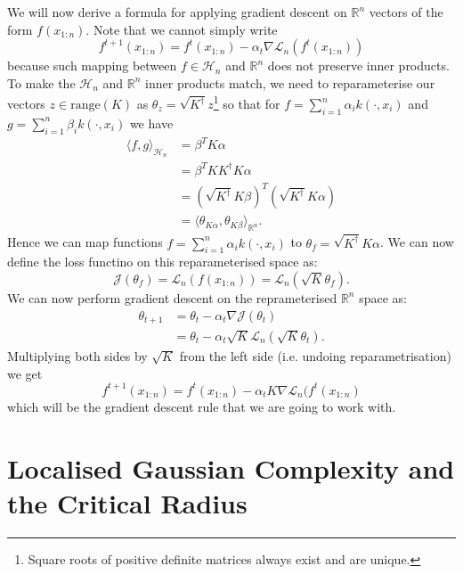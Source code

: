 We will now derive a formula for applying gradient descent on $\mathbb{R}^{n}$ vectors
of the form $f(x_{1:n})$.
Note that we cannot simply write
$$
f^{t+1}(x_{1:n}) = f^{t}(x_{1:n}) - \alpha_{t} \nabla \mathcal{L}_{n}(f^{t}(x_{1:n}))
$$
because such mapping between $f \in \mathcal{H}_{n}$ and $\mathbb{R}^{n}$ does not
preserve inner products.
To make the $\mathcal{H}_{n}$ and $\mathbb{R}^{n}$ inner products match,
we need to reparameterise our vectors $z \in \text{range}(K)$ as
$\theta_{z} = \sqrt{K^{\dagger}}z$\footnote{
Square roots of positive definite matrices always exist and are unique.
}
so that for $f = \sum_{i=1}^{n} \alpha_{i}k(\cdot, x_{i})$ and  $g = \sum_{i=1}^{n} \beta_{i}k(\cdot, x_{i})$
we have
\begin{align*}
\langle f, g \rangle_{\mathcal{H}_{n}} &= \beta^{T} K \alpha \\
                                         &= \beta^{T} K K^{\dagger} K \alpha \\
                                         &= (\sqrt{K^{\dagger}} K\beta)^{T} (\sqrt{K^{\dagger}} K \alpha) \\
                                         &= \langle \theta_{K\alpha}, \theta_{K\beta} \rangle_{\mathbb{R}^{n}}.
\end{align*}
Hence we can map functions $f = \sum_{i=1}^{n} \alpha_{i}k(\cdot, x_{i})$ to
$\theta_{f} = \sqrt{K^{\dagger}}K\alpha$.
We can now define the loss functino on this reparameterised space as:
$$
\mathcal{J}(\theta_f) = \mathcal{L}_{n}(f(x_{1:n})) = \mathcal{L}_{n}(\sqrt{K}\theta_f).
$$
We can now perform gradient descent on the reprameterised $\mathbb{R}^{n}$ space
as:
\begin{align*}
  \theta_{t+1} &= \theta_{t} - \alpha_{t} \nabla \mathcal{J}(\theta_t) \\
               &= \theta_{t} - \alpha_{t} \sqrt{K} \mathcal{L}_{n}(\sqrt{K}\theta_t).
\end{align*}
Multiplying both sides by $\sqrt{K}$ from the left side (i.e. undoing reparametrisation)
we get
\begin{equation}
  f^{t+1}(x_{1:n}) = f^{t}(x_{1:n}) - \alpha_{t}K\nabla\mathcal{L}_{n}(f^{t}(x_{1:n})
\end{equation}
which will be the gradient descent rule that we are going to work with.

\section{Localised Gaussian Complexity and the Critical Radius}

